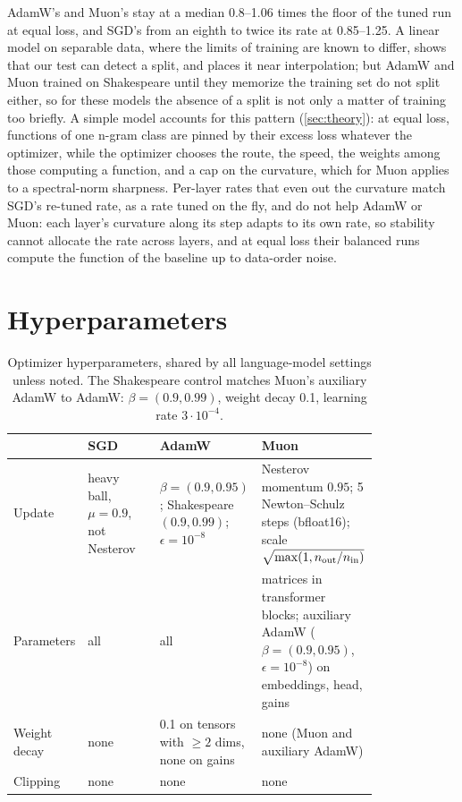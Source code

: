 \documentclass[10pt]{article}
\begin{document}
AdamW's and Muon's stay at a median 0.8--1.06 times the floor of the tuned run at equal loss, and SGD's from an
eighth to twice its rate at 0.85--1.25.
A linear model on separable data, where the limits of training are known to differ, shows that our test can
detect a split, and places it near interpolation; but AdamW and Muon trained on Shakespeare until they memorize
the training set do not split either, so for these models the absence of a split is not only a matter of
training too briefly. A simple model accounts for this pattern (\cref{sec:theory}): at equal loss, functions of
one n-gram class are pinned by their excess loss whatever the optimizer, while the optimizer chooses the route,
the speed, the weights among those computing a function, and a cap on the curvature, which for Muon applies to a
spectral-norm sharpness. Per-layer rates that even out the curvature match SGD's re-tuned rate, as a rate tuned on
the fly, and do not help AdamW or Muon: each layer's curvature along its step adapts to its own rate, so stability
cannot allocate the rate across layers, and at equal loss their balanced runs compute the function of the baseline
up to data-order noise.

\printbibliography

\clearpage
\appendix
\section{Hyperparameters}
\label{app:hparams}

\begin{table}[ht]
\centering\small
\caption{Optimizer hyperparameters, shared by all language-model settings unless noted. The Shakespeare control
matches Muon's auxiliary AdamW to AdamW: $\beta=(0.9,0.99)$, weight decay 0.1, learning rate $3\cdot10^{-4}$.}
\label{tab:optim}
\begin{tabular}{@{}lp{0.27\linewidth}p{0.27\linewidth}p{0.27\linewidth}@{}}
\toprule
 & SGD & AdamW & Muon \\
\midrule
Update & heavy ball, $\mu=0.9$, not Nesterov & $\beta=(0.9,0.95)$; Shakespeare $(0.9,0.99)$; $\epsilon=10^{-8}$ &
  Nesterov momentum $0.95$; 5 Newton--Schulz steps (bfloat16); scale $\sqrt{\max(1,n_{\rm out}/n_{\rm in})}$ \\
Parameters & all & all & matrices in transformer blocks; auxiliary AdamW ($\beta=(0.9,0.95)$, $\epsilon=10^{-8}$) on
  embeddings, head, gains \\
Weight decay & none & 0.1 on tensors with $\ge2$ dims, none on gains & none (Muon and auxiliary AdamW) \\
Clipping & none & none & none \\
\bottomrule
\end{tabular}
\end{table}
\end{document}
